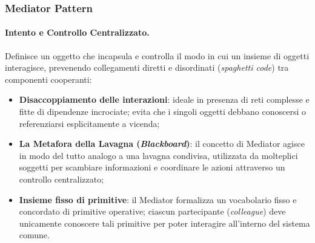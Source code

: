 \documentclass[12pt]{extarticle}
\begin{document}
\subsubsection{Mediator Pattern}

\paragraph{Intento e Controllo Centralizzato.}
Definisce un oggetto che incapsula e controlla il modo in cui un insieme di oggetti interagisce, prevenendo collegamenti diretti e disordinati (\textit{spaghetti code}) tra componenti cooperanti:
\begin{itemize}
    \item \textbf{Disaccoppiamento delle interazioni}: ideale in presenza di reti complesse e fitte di dipendenze incrociate; evita che i singoli oggetti debbano conoscersi o referenziarsi esplicitamente a vicenda;
    \item \textbf{La Metafora della Lavagna (\textit{Blackboard})}: il concetto di Mediator agisce in modo del tutto analogo a una lavagna condivisa, utilizzata da molteplici soggetti per scambiare informazioni e coordinare le azioni attraverso un controllo centralizzato;
    \item \textbf{Insieme fisso di primitive}: il Mediator formalizza un vocabolario fisso e concordato di primitive operative; ciascun partecipante (\textit{colleague}) deve unicamente conoscere tali primitive per poter interagire all'interno del sistema comune.
\end{itemize}
\end{document}
